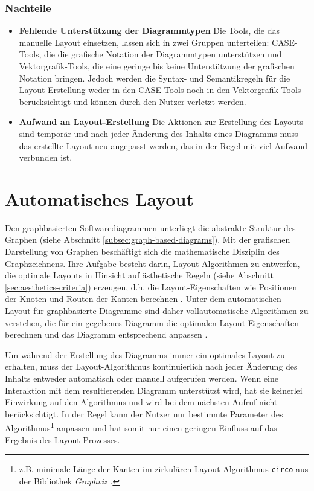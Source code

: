 \subsubsection{Nachteile}

\begin{itemize}
    \item \textbf{Fehlende Unterstützung der Diagrammtypen} Die Tools, die das manuelle Layout einsetzen, lassen sich in zwei Gruppen unterteilen: CASE-Tools, die die grafische Notation der Diagrammtypen unterstützen und Vektorgrafik-Tools, die eine geringe bis keine Unterstützung der grafischen Notation bringen. Jedoch werden die Syntax- und Semantikregeln für die Layout-Erstellung weder in den CASE-Tools noch in den Vektorgrafik-Tools berücksichtigt und können durch den Nutzer verletzt werden.    
    \item \textbf{Aufwand an Layout-Erstellung} Die Aktionen zur Erstellung des Layouts sind temporär und nach jeder Änderung des Inhalts eines Diagramms muss das erstellte Layout neu angepasst werden, das in der Regel mit viel Aufwand verbunden ist.
\end{itemize}

\section{Automatisches Layout}
\label{sec:automatic-layout}

Den graphbasierten Softwarediagrammen unterliegt die abstrakte Struktur des Graphen (siehe Abschnitt \ref{subsec:graph-based-diagrams}). Mit der grafischen Darstellung von Graphen beschäftigt sich die mathematische Disziplin des Graphzeichnens. Ihre Aufgabe besteht darin, Layout-Algorithmen zu entwerfen, die optimale Layouts in Hinsicht auf ästhetische Regeln (siehe Abschnitt \ref{sec:aesthetics-criteria}) erzeugen, d.h. die Layout-Eigenschaften wie Positionen der Knoten und Routen der Kanten berechnen \cite{Eichelberger05Aesthetics, Arvo02Techniques, Siebenhaller03Automatisches, Maier12A-Pattern-based}. Unter dem automatischen Layout für graphbasierte Diagramme sind daher vollautomatische Algorithmen zu verstehen, die für ein gegebenes Diagramm die optimalen Layout-Eigenschaften berechnen und das Diagramm entsprechend anpassen \cite{Fuhrmann11On-the-Pragmatics}.

Um während der Erstellung des Diagramms immer ein optimales Layout zu erhalten, muss der Layout-Algorithmus kontinuierlich nach jeder Änderung des Inhalts entweder automatisch oder manuell aufgerufen werden. Wenn eine Interaktion mit dem resultierenden Diagramm unterstützt wird, hat sie keinerlei Einwirkung auf den Algorithmus und wird bei dem nächsten Aufruf nicht berücksichtigt. In der Regel kann der Nutzer nur bestimmte Parameter des Algorithmus\footnote{z.B. minimale Länge der Kanten im zirkulären Layout-Algorithmus \texttt{circo} aus der Bibliothek \textit{Graphviz} \cite{NorthGansner14Dot-Manual}.} anpassen und hat somit nur einen geringen Einfluss auf das Ergebnis des Layout-Prozesses.

